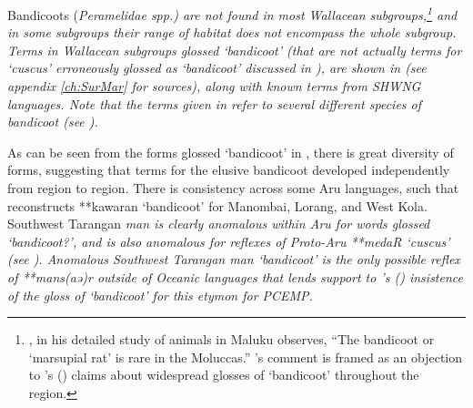 Bandicoots (\it{Peramelidae spp.}) are not found in most
Wallacean subgroups,\footnote{
		\citet[197]{Ellen1993}, in his detailed study of animals in Maluku observes,
		“The bandicoot or ‘marsupial rat’ is rare in the Moluccas.” \citeauthor{Ellen1993}’s
		comment is framed as an objection to \citeauthor{Blust1982}'s (\citeyear[241]{Blust1982}) claims
		about widespread glosses of ‘bandicoot’ throughout the region.}
and in some subgroups their range of habitat does not encompass the whole subgroup.
Terms in Wallacean subgroups glossed ‘bandicoot’ (that are not
actually terms for ‘cuscus’ erroneously glossed as ‘bandicoot’
discussed in ), are shown in  (see appendix \ref{ch:SurMar} for sources),
along with known terms from SHWNG languages.
Note that the terms given in  refer to several different species
of bandicoot (see \citealp[268]{Schapper2011}).

As can be seen from the forms glossed ‘bandicoot’ in ,
there is great diversity of forms,
suggesting that terms for the elusive bandicoot developed independently
from region to region.
There is consistency across some Aru languages,
such that \citet[267]{Schapper2011} reconstructs **kawaran ‘bandicoot’
for Manombai, Lorang, and West Kola.
Southwest Tarangan \it{man} is clearly anomalous within Aru for
words glossed ‘bandicoot?’, and is also anomalous for
reflexes of Proto-Aru **medaR ‘cuscus’ (see ).
Anomalous Southwest Tarangan \it{man} ‘bandicoot’ is the only
possible reflex of **mans(aə)r outside of Oceanic languages that
lends support to \citeauthor{Blust1982}’s (\citeyear{Blust1982,Blust2012b})
insistence of the gloss of ‘bandicoot’ for this etymon
for PCEMP.

